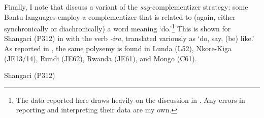 \documentclass[output=paper,colorlinks,citecolor=brown,
]{langscibook}
\begin{document}
Finally, I note that \citet{DevosBostoen:2012} discuss a variant of the \textit{say}-comple\-men\-tizer strategy: some Bantu languages employ a complementizer that is related to (again, either synchronically or diachronically) a word meaning `do.'\footnote{The data reported here draws heavily on the discussion in \citet{DevosBostoen:2012}. Any errors in reporting and interpreting their data  are my own.}  This is shown for Shangaci (P312) in  with the verb \textit{-ira}, translated variously as `do, say, (be) like.' As reported in \citet{DevosBostoen:2012}, the same polysemy is found in  Lunda (L52), Nkore-Kiga (JE13/14), Rundi (JE62), Rwanda (JE61), and Mongo (C61).

%
%
%

\ea\label{ex:gluckman:do} Shangaci (P312) \citep[99]{DevosBostoen:2012} 
	\begin{xlist}
	\end{xlist}
\z
\end{document}

